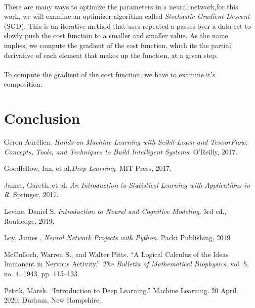 \documentclass[12pt,letterpaper]{article}
\begin{document}
\paragraph*{}There are many ways to optimize the parameters in a neural network,for this work, we will examine an optimizer algorithm called \textit{Stochastic Gradient Descent} (SGD). This is an iterative method that uses repeated a passes over a data set to slowly push the cost function to a smaller and smaller value. As the name implies, we compute the gradient of the cost function, which its the partial derivative of each element that makes up the function, at a given step. 

\paragraph*{}To compute the gradient of the cost function, we have to examine it's composition.



\section*{Conclusion}



\begin{thebibliography}{9}


Géron Aurélien. \textit{Hands-on Machine Learning with Scikit-Learn and TensorFlow: Concepts, Tools, and Techniques to Build Intelligent Systems}. O'Reilly, 2017.

Goodfellow, Ian, et al.\textit{Deep Learning}. MIT Press, 2017.

James, Gareth, et al. \textit{An Introduction to Statistical Learning with Applications in R}. Springer, 2017.

Levine, Daniel S. \textit{Introduction to Neural and Cognitive Modeling}. 3rd ed., Routledge, 2019.

Loy, James , \textit{Neural Network Projects with Python}. Packt Publishing, 2019

McCulloch, Warren S., and Walter Pitts. “A Logical Calculus of the Ideas Immanent in Nervous Activity.” \textit{The Bulletin of Mathematical Biophysics}, vol. 5, no. 4, 1943, pp. 115–133.

Petrik, Marek. “Introduction to Deep Learning.” Machine Learning. 20 April. 2020, Durham, New Hampshire.

\end{thebibliography}

\end{document}
